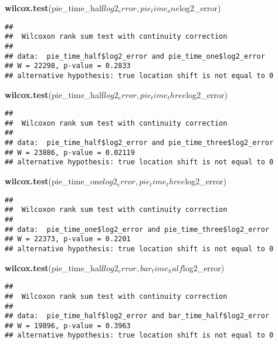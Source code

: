 \documentclass[]{article}
\newenvironment{Shaded}{\begin{snugshade}}{\end{snugshade}}
\newcommand{\KeywordTok}[1]{\textcolor[rgb]{0.13,0.29,0.53}{\textbf{{#1}}}}
\newcommand{\NormalTok}[1]{{#1}}
\begin{document}
\begin{Shaded}
\begin{Highlighting}[]
\KeywordTok{wilcox.test}\NormalTok{(pie_time_half$log2_error, pie_time_one$log2_error)}
\end{Highlighting}
\end{Shaded}

\begin{verbatim}
## 
##  Wilcoxon rank sum test with continuity correction
## 
## data:  pie_time_half$log2_error and pie_time_one$log2_error
## W = 22298, p-value = 0.2833
## alternative hypothesis: true location shift is not equal to 0
\end{verbatim}

\begin{Shaded}
\begin{Highlighting}[]
\KeywordTok{wilcox.test}\NormalTok{(pie_time_half$log2_error, pie_time_three$log2_error)}
\end{Highlighting}
\end{Shaded}

\begin{verbatim}
## 
##  Wilcoxon rank sum test with continuity correction
## 
## data:  pie_time_half$log2_error and pie_time_three$log2_error
## W = 23886, p-value = 0.02119
## alternative hypothesis: true location shift is not equal to 0
\end{verbatim}

\begin{Shaded}
\begin{Highlighting}[]
\KeywordTok{wilcox.test}\NormalTok{(pie_time_one$log2_error, pie_time_three$log2_error)}
\end{Highlighting}
\end{Shaded}

\begin{verbatim}
## 
##  Wilcoxon rank sum test with continuity correction
## 
## data:  pie_time_one$log2_error and pie_time_three$log2_error
## W = 22373, p-value = 0.2201
## alternative hypothesis: true location shift is not equal to 0
\end{verbatim}

\begin{Shaded}
\begin{Highlighting}[]
\KeywordTok{wilcox.test}\NormalTok{(pie_time_half$log2_error, bar_time_half$log2_error)}
\end{Highlighting}
\end{Shaded}

\begin{verbatim}
## 
##  Wilcoxon rank sum test with continuity correction
## 
## data:  pie_time_half$log2_error and bar_time_half$log2_error
## W = 19896, p-value = 0.3963
## alternative hypothesis: true location shift is not equal to 0
\end{verbatim}
\end{document}
